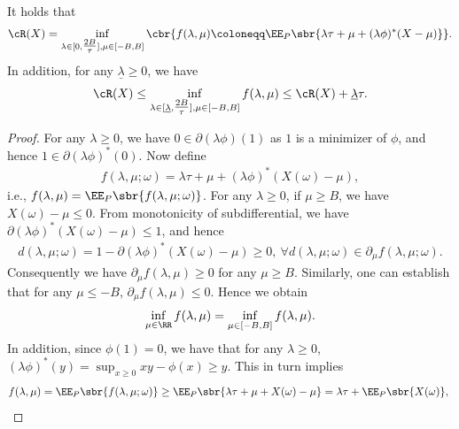 \documentclass[9pt]{article} %
\numberwithin{equation}{section}
\renewcommand{\frac}[2]{\tfrac{#1}{#2}}
\begin{document}
\begin{lemma}\label{lemma_bounded_dual}
It holds that 
\begin{align}\label{eq_phi_dro_f_form_restrict}
    \cR(X) = \inf_{\lambda \in [0, \frac{2B}{\tau}], \mu \in [-B, B]}
    \cbr{f(\lambda, \mu) \coloneqq   
    \EE_P \sbr{ \lambda \tau + \mu + (\lambda \phi)^* (X - \mu) } }.
\end{align}
In addition, for any $\underline{\lambda} \geq 0$, we have 
\begin{align}\label{approx_restrict_lambda}
 \cR(X) \leq 
\inf_{\lambda \in [\underline{\lambda} , \frac{2B}{\tau}], \mu \in [-B, B]} f(\lambda, \mu) 
\leq \cR(X) + \underline{\lambda} \tau  .
\end{align}
\end{lemma}


\begin{proof}
For any $\lambda \geq 0$,  we have $0 \in \partial (\lambda \phi)(1)$ as  $1$ is a minimizer of $\phi$,
and hence $1 \in \partial (\lambda \phi)^*(0)$. 
Now define 
\begin{align}\label{f_def_sample}
f(\lambda, \mu; \omega) = \lambda \tau + \mu + (\lambda \phi)^*(X(\omega) - \mu),
\end{align}
 i.e.,
$f (\lambda, \mu) = \EE_{P} \sbr{f(\lambda, \mu; \omega)}$. 
For any $\lambda \geq 0$, if $\mu \geq B$, we have  $X(\omega) - \mu \leq 0$.
From monotonicity of subdifferential, we have $\partial (\lambda \phi)^* (X(\omega) - \mu) \leq 1$, and hence
\begin{align*}
d (\lambda, \mu; \omega) = 1 - \partial (\lambda \phi)^* (X(\omega) - \mu) \geq 0, ~ \forall d(\lambda, \mu; \omega) \in \partial_\mu f(\lambda, \mu; \omega).
\end{align*}
Consequently we have $\partial_\mu f(\lambda, \mu) \geq 0$ for any $\mu \geq B$. 
Similarly, one can  establish that 
for any $\mu \leq -B$, $\partial_\mu f(\lambda, \mu) \leq 0$.
Hence we obtain 
\begin{align}\label{fix_lambda_u_bound}
\inf_{\mu \in \RR} f(\lambda, \mu) = \inf_{\mu \in [-B, B]} f(\lambda, \mu).
\end{align}
In addition, since $\phi(1) = 0$, we have that for any $\lambda \geq 0$, 
$(\lambda \phi)^*(y) = \sup_{x \geq 0} xy - \phi(x) \geq y$.
This in turn implies 
\begin{align*}
f(\lambda, \mu) = \EE_P \sbr{ f(\lambda, \mu; \omega)}  \geq \EE_P \sbr{ \lambda \tau + \mu + X(\omega) - \mu} = \lambda \tau + \EE_P \sbr{X(\omega)}, ~

\end{align*}
\end{proof}
\end{document}
